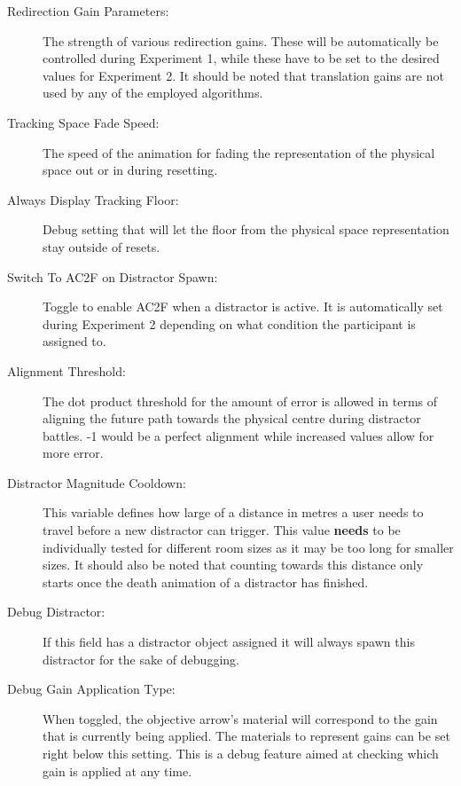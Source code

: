 \begin{description}
   \item[Redirection Gain Parameters:] The strength of various redirection gains. These will be automatically be controlled during Experiment 1, while these have to be set to the desired values for Experiment 2. It should be noted that translation gains are not used by any of the employed algorithms.
   \item[Tracking Space Fade Speed:] The speed of the animation for fading the representation of the physical space out or in during resetting.
   \item[Always Display Tracking Floor:] Debug setting that will let the floor from the physical space representation stay outside of resets.
   \item[Switch To AC2F on Distractor Spawn:] Toggle to enable AC2F when a distractor is active. It is automatically set during Experiment 2 depending on what condition the participant is assigned to. 
   \item[Alignment Threshold:] The dot product threshold for the amount of error is allowed in terms of aligning the future path towards the physical centre during distractor battles. -1 would be a perfect alignment while increased values allow for more error. 
   \item[Distractor Magnitude Cooldown:] This variable defines how large of a distance in metres a user needs to travel before a new distractor can trigger. This value \textbf{needs} to be individually tested for different room sizes as it may be too long for smaller sizes. It should also be noted that counting towards this distance only starts once the death animation of a distractor has finished. 
   \item[Debug Distractor:] If this field has a distractor object assigned it will always spawn this distractor for the sake of debugging. 
   \item[Debug Gain Application Type:] When toggled, the objective arrow's material will correspond to the gain that is currently being applied. The materials to represent gains can be set right below this setting. This is a debug feature aimed at checking which gain is applied at any time. 
\end{description}

